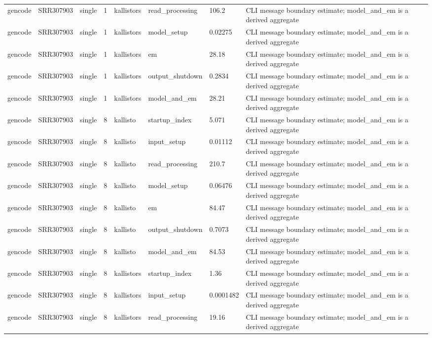\begin{tabular}{llllllll}
gencode & SRR307903 & single & 1 & kallistors & read\_processing & 106.2 & CLI message boundary estimate; model\_and\_em is a derived aggregate \\
gencode & SRR307903 & single & 1 & kallistors & model\_setup & 0.02275 & CLI message boundary estimate; model\_and\_em is a derived aggregate \\
gencode & SRR307903 & single & 1 & kallistors & em & 28.18 & CLI message boundary estimate; model\_and\_em is a derived aggregate \\
gencode & SRR307903 & single & 1 & kallistors & output\_shutdown & 0.2834 & CLI message boundary estimate; model\_and\_em is a derived aggregate \\
gencode & SRR307903 & single & 1 & kallistors & model\_and\_em & 28.21 & CLI message boundary estimate; model\_and\_em is a derived aggregate \\
gencode & SRR307903 & single & 8 & kallisto & startup\_index & 5.071 & CLI message boundary estimate; model\_and\_em is a derived aggregate \\
gencode & SRR307903 & single & 8 & kallisto & input\_setup & 0.01112 & CLI message boundary estimate; model\_and\_em is a derived aggregate \\
gencode & SRR307903 & single & 8 & kallisto & read\_processing & 210.7 & CLI message boundary estimate; model\_and\_em is a derived aggregate \\
gencode & SRR307903 & single & 8 & kallisto & model\_setup & 0.06476 & CLI message boundary estimate; model\_and\_em is a derived aggregate \\
gencode & SRR307903 & single & 8 & kallisto & em & 84.47 & CLI message boundary estimate; model\_and\_em is a derived aggregate \\
gencode & SRR307903 & single & 8 & kallisto & output\_shutdown & 0.7073 & CLI message boundary estimate; model\_and\_em is a derived aggregate \\
gencode & SRR307903 & single & 8 & kallisto & model\_and\_em & 84.53 & CLI message boundary estimate; model\_and\_em is a derived aggregate \\
gencode & SRR307903 & single & 8 & kallistors & startup\_index & 1.36 & CLI message boundary estimate; model\_and\_em is a derived aggregate \\
gencode & SRR307903 & single & 8 & kallistors & input\_setup & 0.0001482 & CLI message boundary estimate; model\_and\_em is a derived aggregate \\
gencode & SRR307903 & single & 8 & kallistors & read\_processing & 19.16 & CLI message boundary estimate; model\_and\_em is a derived aggregate \\

\end{tabular}
